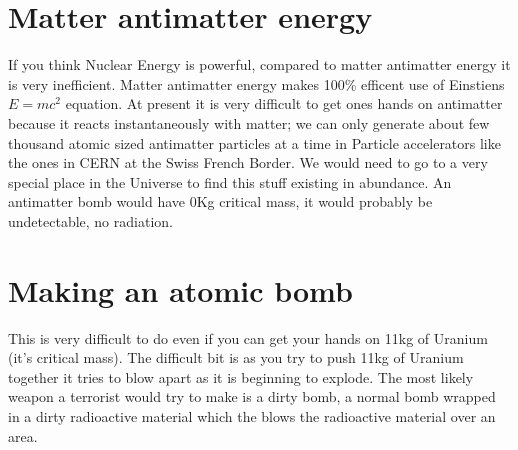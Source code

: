 \documentclass[a4paper,12pt,titlepage]{book}
\begin{document}
\section{Matter antimatter energy}
If you think Nuclear Energy is powerful,
compared to matter antimatter energy it
is very inefficient. Matter antimatter energy
makes 100\% efficent use of Einstiens
\begin{math} 
E=mc^{2} 
\end{math}
equation.
At present it is very difficult to get
ones hands on antimatter because it reacts
instantaneously with matter; we can only
generate about few thousand atomic sized antimatter particles
at a time in Particle accelerators like the
ones in CERN at the Swiss French Border.
We would need to go to a very special place
in the Universe to find this stuff existing 
in abundance.
An antimatter bomb would have 0Kg critical mass,
it would probably be undetectable, no radiation.

\section{Making an atomic bomb}
This is very difficult to do even if you can
get your hands on 11kg of Uranium (it's critical mass).
The difficult bit is as you try to push 11kg of
Uranium together it tries to blow apart as it is
beginning to explode.
The most likely weapon a terrorist would try to
make is a dirty bomb, a normal bomb wrapped
in a dirty radioactive material which the blows
the radioactive material over an area.
\end{document}
